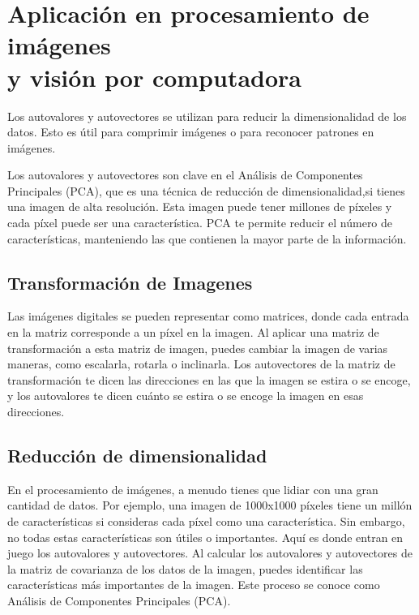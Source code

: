 \section[Aplicación en procesamiento de imágenes y visión por computadora]{Aplicación en procesamiento de imágenes \\ y visión por computadora} %
\label{sub:Aplicación en procesamiento de imágenes y visión por computadora}

Los autovalores y autovectores se utilizan para reducir la dimensionalidad de los datos. Esto es útil para comprimir imágenes o para reconocer patrones en imágenes.

Los autovalores y autovectores son clave en el Análisis de Componentes Principales (PCA), que es una técnica de reducción de dimensionalidad,si  tienes una imagen de alta resolución. Esta imagen puede tener millones de píxeles y cada píxel puede ser una característica. 
PCA te permite reducir el número de características, manteniendo las que contienen la mayor parte de la información.


\subsection{Transformación de Imagenes} %
\label{sec:Transformación de Imagenes}

Las imágenes digitales se pueden representar como matrices, donde cada entrada en la matriz corresponde a un píxel en la imagen. Al aplicar una matriz de transformación a esta matriz de imagen, puedes cambiar la imagen de varias maneras, como escalarla, rotarla o inclinarla. Los autovectores de la matriz de transformación te dicen las direcciones en las que la imagen se estira o se encoge, y los autovalores te dicen cuánto se estira o se encoge la imagen en esas direcciones.

\subsection{Reducción de dimensionalidad} %
\label{sec:Reducción de dimensionalidad}
En el procesamiento de imágenes, a menudo tienes que lidiar con una gran cantidad de datos. Por ejemplo, una imagen de 1000x1000 píxeles tiene un millón de características si consideras cada píxel como una característica. Sin embargo, no todas estas características son útiles o importantes. Aquí es donde entran en juego los autovalores y autovectores. Al calcular los autovalores y autovectores de la matriz de covarianza de los datos de la imagen, puedes identificar las características más importantes de la imagen. Este proceso se conoce como Análisis de Componentes Principales (PCA).

